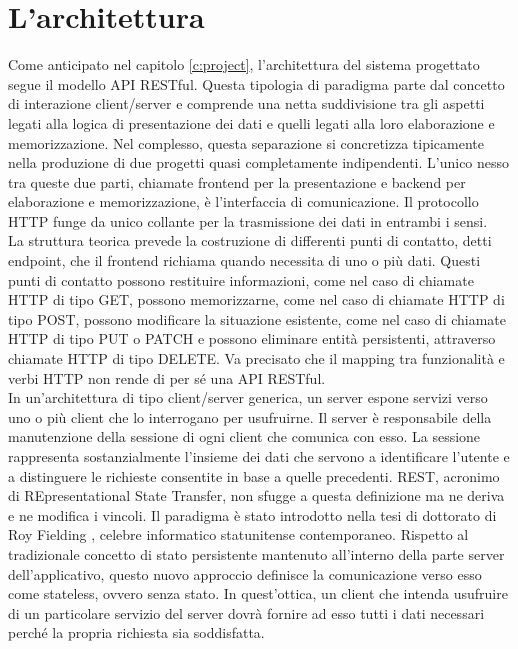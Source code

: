 \chapter{L'architettura}\label{c:architecture}

Come anticipato nel capitolo \ref{c:project}, l'architettura del sistema progettato segue il modello API RESTful.
Questa tipologia di paradigma parte dal concetto di interazione client/server e comprende una netta suddivisione tra gli aspetti legati alla logica di presentazione dei dati e quelli legati alla loro elaborazione e memorizzazione.
Nel complesso, questa separazione si concretizza tipicamente nella produzione di due progetti quasi completamente indipendenti.
L'unico nesso tra queste due parti, chiamate frontend per la presentazione e backend per elaborazione e memorizzazione, è l'interfaccia di comunicazione.
Il protocollo HTTP funge da unico collante per la trasmissione dei dati in entrambi i sensi.
\\
La struttura teorica prevede la costruzione di differenti punti di contatto, detti endpoint, che il frontend richiama quando necessita di uno o più dati.
Questi punti di contatto possono restituire informazioni, come nel caso di chiamate HTTP di tipo GET, possono memorizzarne, come nel caso di chiamate HTTP di tipo POST, possono modificare
la situazione esistente, come nel caso di chiamate HTTP di tipo PUT o PATCH e possono eliminare entità persistenti, attraverso chiamate HTTP di tipo DELETE.
Va precisato che il mapping tra funzionalità e verbi HTTP non rende di per sé una API RESTful.
\\
In un'architettura di tipo client/server generica, un server espone servizi verso uno o più client che lo interrogano per usufruirne.
Il server è responsabile della manutenzione della sessione di ogni client che comunica con esso.
La sessione rappresenta sostanzialmente l'insieme dei dati che servono a identificare l'utente e a distinguere le richieste consentite in base a quelle precedenti.
REST, acronimo di REpresentational State Transfer, non sfugge a questa definizione ma ne deriva e ne modifica i vincoli.
Il paradigma è stato introdotto nella tesi di dottorato di Roy Fielding \cite{fielding2000architectural}, celebre informatico statunitense contemporaneo.
Rispetto al tradizionale concetto di stato persistente mantenuto all'interno della parte server dell'applicativo, questo nuovo approccio definisce la comunicazione verso esso come stateless, ovvero senza stato.
In quest'ottica, un client che intenda usufruire di un particolare servizio del server dovrà fornire ad esso tutti i dati necessari perché la propria richiesta sia soddisfatta.
